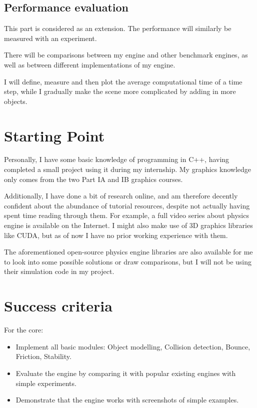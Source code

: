 \documentclass[12pt,a4paper,twoside]{article}
\begin{document}
\subsection*{Performance evaluation}

This part is considered as an extension. The performance will similarly be measured with an experiment.

There will be comparisons between my engine and other benchmark engines, 
as well as between different implementations of my engine.

I will define, measure and then plot the average computational time of a time step, while
I gradually make the scene more complicated by adding in more objects.

\section*{Starting Point}

Personally, I have some basic knowledge of programming in C++, having completed a small project using it during my internship.
My graphics knowledge only comes from the two Part IA and IB graphics courses.

Additionally, I have done a bit of research online, 
and am therefore decently confident about the abundance of tutorial resources, 
despite not actually having spent time reading through them.
For example, a full video series about physics engine is available on the Internet\cite{tutorialyt}.
I might also make use of 3D graphics libraries like CUDA\cite{cuda}, but as of now I have no prior working experience with them.

The aforementioned open-source physics engine libraries are also available for me to look into some possible solutions or draw comparisons, 
but I will not be using their simulation code in my project.

\section*{Success criteria}

For the core:

\begin{itemize}
\item Implement all basic modules: Object modelling, Collision detection, Bounce, Friction, Stability.

\item Evaluate the engine by comparing it with popular existing engines with simple experiments.

\item Demonstrate that the engine works with screenshots of simple examples.
\end{itemize}
\end{document}
